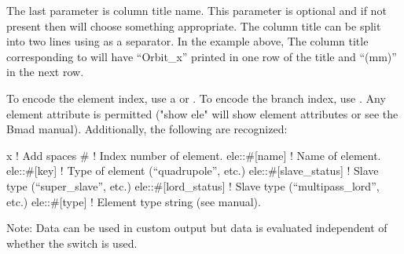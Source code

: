 {{{{{{{{\begin{description}
The last parameter is column title name. This parameter is optional and if not present then \tao
will choose something appropriate. The column title can be split into two lines using  as a
separator.  In the example above, The column title corresponding to  will have
``Orbit_x'' printed in one row of the title and ``(mm)'' in the next row.

To encode the element index, use a \vn{\#} or . To encode the branch index, use
. Any element attribute is permitted ("show ele" will show element attributes or see
the Bmad manual). Additionally, the following are recognized:
\begin{example}
  x                           ! Add spaces
  #                           ! Index number of element.
  ele::#[name]                ! Name of element.
  ele::#[key]                 ! Type of element (``quadrupole'', etc.)
  ele::#[slave_status]        ! Slave type (``super_slave'', etc.)
  ele::#[lord_status]         ! Slave type (``multipass_lord'', etc.)
  ele::#[type]                ! Element type string (see \bmad manual).
\end{example}

Note: Data can be used in custom output but data is evaluated independent of whether the
 switch is used.


\end{description}}}}}}}}}
